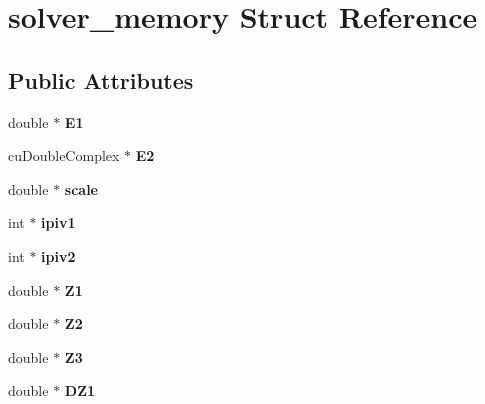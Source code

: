 \hypertarget{structsolver__memory}{}\section{solver\+\_\+memory Struct Reference}
\label{structsolver__memory}
\subsection*{Public Attributes}
\begin{DoxyCompactItemize}
\item 
double $\ast$ {\bfseries E1}\hypertarget{structsolver__memory_a7824c82c506777035a208d517b3cfbd4}{}\label{structsolver__memory_a7824c82c506777035a208d517b3cfbd4}

\item 
cu\+Double\+Complex $\ast$ {\bfseries E2}\hypertarget{structsolver__memory_a621540fabff6c08b742603bb8bac0fd0}{}\label{structsolver__memory_a621540fabff6c08b742603bb8bac0fd0}

\item 
double $\ast$ {\bfseries scale}\hypertarget{structsolver__memory_a29579f9ea0ff60e09652a35b3ff84113}{}\label{structsolver__memory_a29579f9ea0ff60e09652a35b3ff84113}

\item 
int $\ast$ {\bfseries ipiv1}\hypertarget{structsolver__memory_aa57a244e8903afaa7cb8be0efa6ca838}{}\label{structsolver__memory_aa57a244e8903afaa7cb8be0efa6ca838}

\item 
int $\ast$ {\bfseries ipiv2}\hypertarget{structsolver__memory_af7a33bfecc1bfbec0f7834facb72369e}{}\label{structsolver__memory_af7a33bfecc1bfbec0f7834facb72369e}

\item 
double $\ast$ {\bfseries Z1}\hypertarget{structsolver__memory_aa494e688ee8d9516ffe48e4f26bb9455}{}\label{structsolver__memory_aa494e688ee8d9516ffe48e4f26bb9455}

\item 
double $\ast$ {\bfseries Z2}\hypertarget{structsolver__memory_a2450435b9370ebf22d87f51f7b18c629}{}\label{structsolver__memory_a2450435b9370ebf22d87f51f7b18c629}

\item 
double $\ast$ {\bfseries Z3}\hypertarget{structsolver__memory_a3f13b379ba1ecb183bf9f22c2ef3f23c}{}\label{structsolver__memory_a3f13b379ba1ecb183bf9f22c2ef3f23c}

\item 
double $\ast$ {\bfseries D\+Z1}\hypertarget{structsolver__memory_a298b97442915b9fd35c634ea519cb07c}{}\label{structsolver__memory_a298b97442915b9fd35c634ea519cb07c}


\end{DoxyCompactItemize}
